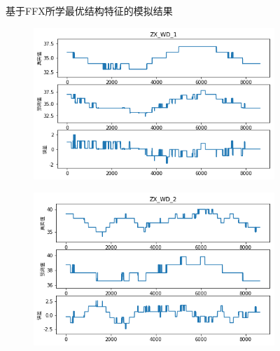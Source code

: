 \begin{figure}[H]
\begin{subfigure}[t]{0.48\textwidth}
\end{subfigure}
\caption{基于FFX所学最优结构特征的模拟结果}
\label{fig:ffx_zx_wd}
\end{figure}

\begin{figure}[H]
\centering
\begin{subfigure}[t]{0.48\textwidth}
    \centering
    \includegraphics[scale=0.45]{figures/sr/deap-zw_wd_1.png}
\end{subfigure}\hfill
\begin{subfigure}[t]{0.48\textwidth}
    \centering
    \includegraphics[scale=0.45]{figures/sr/deap-zw_wd_2.png}
\end{subfigure}\\
\begin{subfigure}[t]{0.48\textwidth}
  \centering

\end{subfigure}
\end{figure}
